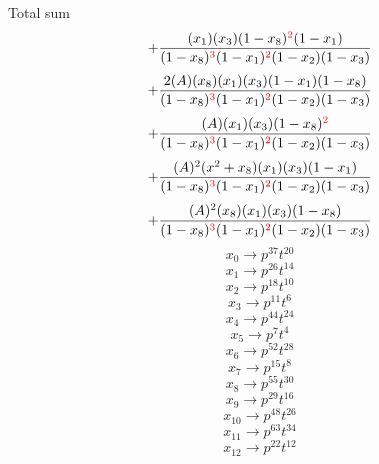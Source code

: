 \documentclass{article}
\begin{document}
Total sum
\[+\frac{(x_1)(x_3)(1-x_8)^{\textcolor{red}{2}}(1-x_1)}{(1-x_8)^{\textcolor{red}{3}}(1-x_1)^{\textcolor{red}{2}}(1-x_2)(1-x_3)}\]\[+\frac{2(A)(x_8)(x_1)(x_3)(1-x_1)(1-x_8)}{(1-x_8)^{\textcolor{red}{3}}(1-x_1)^{\textcolor{red}{2}}(1-x_2)(1-x_3)}\]\[+\frac{(A)(x_1)(x_3)(1-x_8)^{\textcolor{red}{2}}}{(1-x_8)^{\textcolor{red}{3}}(1-x_1)^{\textcolor{red}{2}}(1-x_2)(1-x_3)}\]\[+\frac{(A)^{2}(x^{2}+x_8)(x_1)(x_3)(1-x_1)}{(1-x_8)^{\textcolor{red}{3}}(1-x_1)^{\textcolor{red}{2}}(1-x_2)(1-x_3)}\]\[+\frac{(A)^{2}(x_8)(x_1)(x_3)(1-x_8)}{(1-x_8)^{\textcolor{red}{3}}(1-x_1)^{\textcolor{red}{2}}(1-x_2)(1-x_3)}\]\[x_0\rightarrow{p^{37}t^{20}}\]\[x_1\rightarrow{p^{26}t^{14}}\]\[x_2\rightarrow{p^{18}t^{10}}\]\[x_3\rightarrow{p^{11}t^{6}}\]\[x_4\rightarrow{p^{44}t^{24}}\]\[x_5\rightarrow{p^{7}t^{4}}\]\[x_6\rightarrow{p^{52}t^{28}}\]\[x_7\rightarrow{p^{15}t^{8}}\]\[x_8\rightarrow{p^{55}t^{30}}\]\[x_9\rightarrow{p^{29}t^{16}}\]\[x_10\rightarrow{p^{48}t^{26}}\]\[x_11\rightarrow{p^{63}t^{34}}\]\[x_12\rightarrow{p^{22}t^{12}}\]
\end{document}

